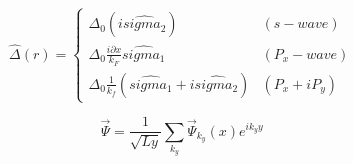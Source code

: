 \documentclass{jsarticle}
\begin{document}
		\begin{equation}
			\hat{\Delta}(r)=
			\begin{cases}
				\Delta_0 \left( i \hat{sigma_2} \right) & \left( s-wave \right) \\
				\Delta_0\frac{i\partial x}{k_F}\hat{sigma_1} & \left( P_x-wave \right) \\
				\Delta_0\frac{1}{k_f} \left( \hat{sigma_1}+i\hat{sigma_2} \right) & \left( P_x+iP_y \right)
			\end{cases}
		\end{equation}

		\begin{equation}
			\vec{\Psi}=\frac{1}{\sqrt{Ly}}\sum_{k_y} \vec{\Psi}_{k_y}(x) e^{ik_yy}
		\end{equation}
\end{document}
